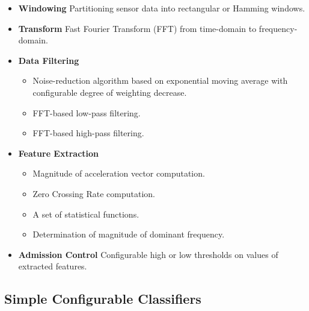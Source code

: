 \begin{itemize}

	\item {\bf Windowing} Partitioning sensor data into rectangular or Hamming windows.
		
	\item {\bf Transform} Fast Fourier Transform (FFT) from time-domain to frequency-domain.
	  
	\item {\bf Data Filtering} 
		\begin{itemize}
			\item Noise-reduction algorithm based on exponential moving average with 
	  configurable degree of weighting decrease.
			\item FFT-based low-pass filtering.
			\item FFT-based high-pass filtering.
		\end{itemize}

	\item {\bf Feature Extraction} 
		\begin{itemize}
			\item Magnitude of acceleration vector computation.
			\item Zero Crossing Rate computation.
			\item A set of statistical functions.
			\item Determination of magnitude of dominant frequency.
		\end{itemize}

	\item {\bf Admission Control} Configurable high or low thresholds on values of extracted features.
  
\end{itemize}


\subsection{Simple Configurable Classifiers}
\label{sec:classifiers}

\iffalse
\begin{figure*}[t]
{\small
	\begin{verbatim}
# segment audio data
$DATA > window type=rect size=256000 overlap=32000 > $win

# compute variance of amplitude
$win > stat type=var > $varamp

# compute variance of zero crossing rate
$win > window type=rect size=500 | extract type=zcr | stat type=var > $varzcr

# perform threshold-based admission control
$varamp > admissioncontrol type=threshold min=0.002 max=0.013 > $acamp
$varzcr > admissioncontrol type=threshold min=150 max=1100 > $aczcr

# check if admission control passed
assert $acamp
assert $aczcr

# pass raw sensor data to application
return $win
	\end{verbatim}
}
	\caption{SCC definition for music detection}
    \label{fig:sccLanguageMusicDetectionOld}
\end{figure*}
\fi

